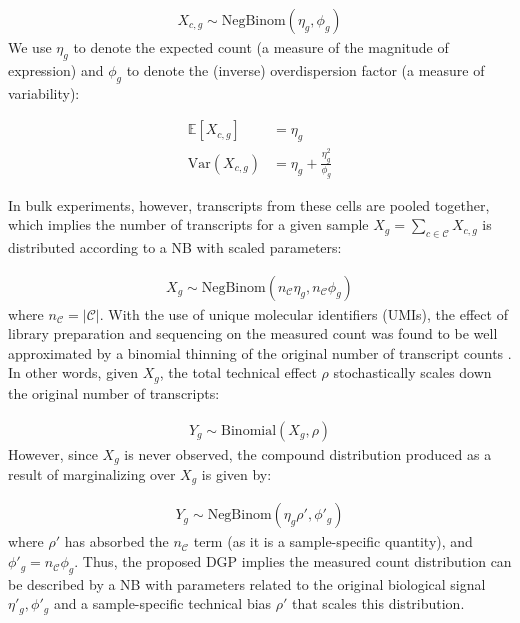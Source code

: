 \documentclass[10pt,letterpaper]{article}
\begin{document}
\begin{align*}
    X_{c,g} \sim \text{NegBinom}(\eta_g, \phi_g)
\end{align*}
We use $\eta_g$ to denote the expected count (a measure of the magnitude of expression) and $\phi_g$ to denote the (inverse) overdispersion factor (a measure of variability):

\begin{subequations}
    \begin{align}
        \mathbb{E}[X_{c,g}] &= \eta_g \\
        \text{Var}(X_{c,g}) &= \eta_g + \frac{\eta_g^2}{\phi_g}
    \end{align}
\end{subequations}

In bulk experiments, however, transcripts from these cells are pooled together, which implies the number of transcripts for a given sample $X_g = \sum_{c \in \mathcal{C}} X_{c,g}$ is distributed according to a NB with scaled parameters:

\begin{align}
    X_g \sim \text{NegBinom}(n_{\mathcal{C}} \eta_g, n_{\mathcal{C}} \phi_g)
\end{align}
where $n_{\mathcal{C}} = |\mathcal{C}|$.
With the use of unique molecular identifiers (UMIs), the effect of library preparation and sequencing on the measured count was found to be well approximated by a binomial thinning \cite{kella_binomial_2023} of the original number of transcript counts \cite{schwabe_relation_2022}. 
In other words, given $X_g$, the total technical effect $\rho$ stochastically scales down the original number of transcripts:

\begin{align}
    Y_g \sim \text{Binomial}(X_g, \rho)
\end{align}
However, since $X_g$ is never observed, the compound distribution produced as a result of marginalizing over $X_g$ is given by:

\begin{align}
    Y_g \sim \text{NegBinom}(\eta_g \rho', \phi'_g)
\end{align}
where $\rho'$ has absorbed the $n_{\mathcal{C}}$ term (as it is a sample-specific quantity), and $\phi'_g = n_{\mathcal{C}} \phi_g$.
Thus, the proposed DGP implies the measured count distribution can be described by a NB with parameters related to the original biological signal $\eta'_g, \phi'_g$ and a sample-specific technical bias $\rho'$ that scales this distribution.
\end{document}
